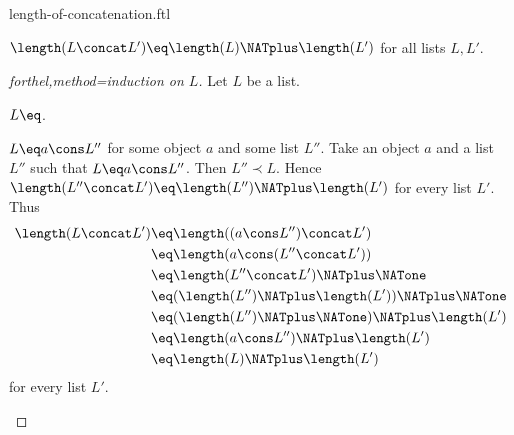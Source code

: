 \documentclass{naproche-library}
\begin{document}
\begin{smodule}[title=Length of Concatenation]{length-of-concatenation.ftl}

\begin{proposition}[forthel,id=LengthOfConcatProp]
  $\length(L \concat L') \eq \length(L) \NATplus \length(L')$ for all lists $L, L'$.
\end{proposition}
\begin{proof}[forthel,method=induction on $L$]
  Let $L$ be a list.

  \begin{case}{$L \eq \list{}$.} \end{case}

  \begin{case}{$L \eq a \cons L''$ for some object $a$ and some list $L''$.}
    Take an object $a$ and a list $L''$ such that $L \eq a \cons L''$.
    Then $L'' \prec L$.
    Hence $\length(L'' \concat L') \eq \length(L'') \NATplus \length(L')$ for every list $L'$.
    Thus
    \begin{align*}
      \length(L \concat L')
        &\eq \length((a \cons L'') \concat L')\\
        &\eq \length(a \cons (L'' \concat L'))\\
        &\eq \length(L'' \concat L') \NATplus \NATone\\
        &\eq (\length(L'') \NATplus \length(L')) \NATplus \NATone\\
        &\eq (\length(L'') \NATplus \NATone) \NATplus \length(L')\\
        &\eq \length(a \cons L'') \NATplus \length(L')\\
        &\eq \length(L) \NATplus \length(L')
    \end{align*}
    for every list $L'$.
  \end{case}
\end{proof}
\end{smodule}
\end{document}

